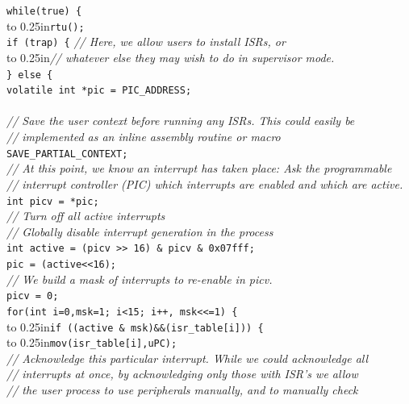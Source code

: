 \documentclass{gqtekspec}
\begin{document}
\begin{table}\begin{center}
\begin{tabbing}
{\tt while(true) \{} \\
\hbox to 0.25in{}\= {\tt rtu();}\\
	\> {\tt if (trap) \{} {\em // Here, we allow users to install ISRs, or} \\
	\>\hbox to 0.25in{}\= {\em // whatever else they may wish to do in supervisor mode.} \\
	\> {\tt \} else \{} \\
	\> \> {\tt volatile int *pic = PIC\_ADDRESS;} \\
\\
	\> \> {\em // Save the user context before running any ISRs.  This could easily be}\\
	\> \> {\em // implemented as an inline assembly routine or macro}\\
	\> \> {\tt SAVE\_PARTIAL\_CONTEXT; }\\
	\> \> {\em // At this point, we know an interrupt has taken place:  Ask the programmable}\\
	\> \> {\em // interrupt controller (PIC) which interrupts are enabled and which are active.}\\
	\> \>	{\tt int	picv = *pic;}\\
	\> \>	{\em // Turn off all active interrupts}\\
	\> \>	{\em // Globally disable interrupt generation in the process}\\
	\> \>	{\tt int	active = (picv >> 16) \& picv \& 0x07fff;}\\
	\> \>	{\tt *pic = (active<<16);}\\
	\> \>	{\em // We build a mask of interrupts to re-enable in picv.}\\
	\> \>	{\tt picv = 0;}\\
	\> \>	{\tt for(int i=0,msk=1; i<15; i++, msk<<=1) \{}\\
	\> \>\hbox to 0.25in{}\={\tt if ((active \& msk)\&\&(isr\_table[i])) \{}\\
	\> \>\>\hbox to 0.25in{}\= {\tt mov(isr\_table[i],uPC); }\\
	\> \>\>\>	{\em // Acknowledge this particular interrupt.  While we could acknowledge all}\\
	\> \>\>\>	{\em // interrupts at once, by acknowledging only those with ISR's we allow}\\
	\> \>\>\>	{\em // the user process to use peripherals manually, and to manually check}\\

\end{tabbing}
\end{center}
\end{table}
\end{document}
